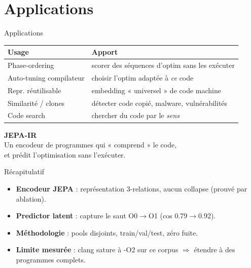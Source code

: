 \documentclass[aspectratio=169,11pt]{beamer}
\newcommand{\good}[1]{\textcolor{jgreen}{\textbf{#1}}}
\begin{document}
\section{Applications}
\begin{frame}{Applications}
  \centering\small
  \begin{tabular}{ll}
    \toprule
    Usage & Apport \\
    \midrule
    Phase-ordering & scorer des séquences d'optim sans les exécuter \\
    Auto-tuning compilateur & choisir l'optim adaptée à \emph{ce} code \\
    Repr. réutilisable & embedding « universel » de code machine \\
    Similarité / clones & détecter code copié, malware, vulnérabilités \\
    Code search & chercher du code par le \emph{sens} \\
    \bottomrule
  \end{tabular}
\end{frame}

\begin{frame}
  \vfill
  \centering
  {\Huge\textcolor{jblue}{\textbf{JEPA-IR}}}\\[4mm]
  {\large Un encodeur de programmes qui « comprend » le code,\\
  et prédit l'optimisation sans l'exécuter.}
  \vfill
\end{frame}

\begin{frame}{Récapitulatif}
  \begin{itemize}
    \item \good{Encodeur JEPA} : représentation 3-relations, aucun collapse
          (prouvé par ablation).
    \item \good{Predictor latent} : capture le saut O0$\to$O1 (cos 0.79$\to$0.92).
    \item \good{Méthodologie} : pools disjoints, train/val/test, zéro fuite.
    \item \good{Limite mesurée} : clang sature à -O2 sur ce corpus
          $\Rightarrow$ étendre à des programmes complets.
  \end{itemize}
\end{frame}
\end{document}
